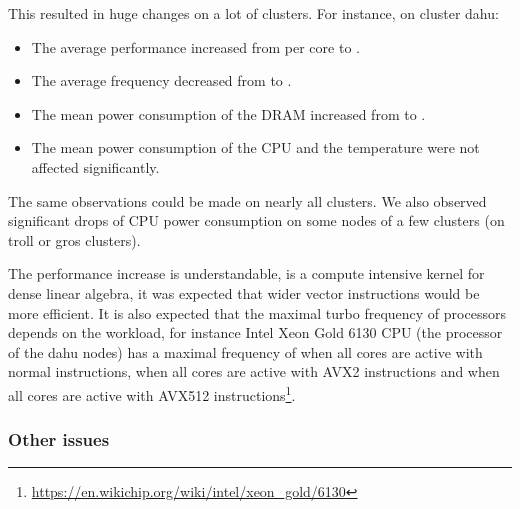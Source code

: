                 This resulted in huge changes on a lot of clusters. For instance, on cluster dahu:
                \begin{itemize}
                    \item The average performance increased from  per core to
                        .
                    \item The average frequency decreased from  to .
                    \item The mean power consumption of the DRAM increased from  to .
                    \item The mean power consumption of the CPU and the temperature were not affected significantly.
                \end{itemize}
                The same observations could be made on nearly all clusters. We also observed significant drops of CPU
                power consumption on some nodes of a few clusters (\eg on troll or gros clusters).

                The performance increase is understandable, \dgemm is a compute intensive kernel for dense linear
                algebra, it was expected that wider vector instructions would be more efficient. It is also expected
                that the maximal turbo frequency of processors depends on the workload, for instance Intel Xeon Gold
                6130 CPU (the processor of the dahu nodes) has a maximal frequency of  when all
                cores are active with normal instructions,  when all cores are active with AVX2
                instructions and  when all cores are active with AVX512
                instructions\footnote{\url{https://en.wikichip.org/wiki/intel/xeon\_gold/6130}}.

            \subsubsection{Other issues}%

